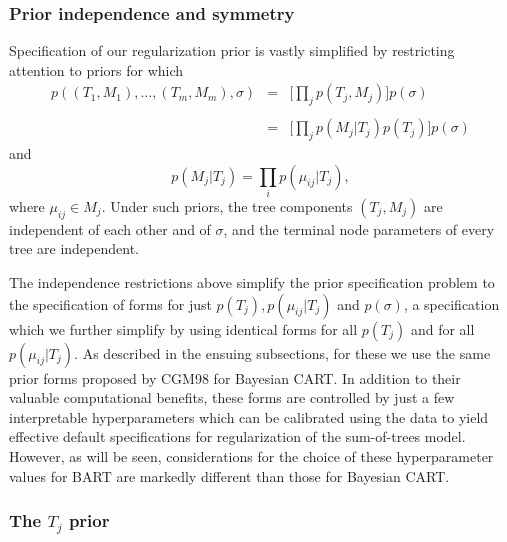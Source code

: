 \documentclass[aoas,nameyear,dvips]{arximspdf}
\begin{document}
\subsubsection{Prior independence and symmetry}\label{sec:simplification}


Specification of our regularization prior is vastly simplified by restricting attention to
priors for which
\begin{eqnarray}\label{indep1}
p((T_1,M_1),\ldots,(T_m,M_m),\sigma)
 & = &  \biggl[\prod_j p(T_j,M_j) \biggr]   p(\sigma)
 \nonumber\\[-8pt]\\[-8pt]
 & = &  \biggl[\prod_j p(M_j | T_j) p(T_j) \biggr]\nonumber
 p(\sigma)
\end{eqnarray}
and
\begin{equation}\label{indep2}
p(M_j   |   T_j) = \prod_i{p(\mu_{ij} | T_j)},
\end{equation}
where $\mu_{ij} \in M_j$.  Under such
priors, the tree components $(T_j,M_j)$ are independent of each other and of
 $\sigma$, and the terminal node parameters of every tree are
independent.


The independence restrictions above simplify the prior specification
problem to the specification of forms for just $p(T_j),
p(\mu_{ij} | T_j)$ and $p(\sigma)$, a specification which we further simplify by
using identical forms for all $p(T_j)$ and for all
$p(\mu_{ij} | T_j)$.  As described in the ensuing
subsections, for these we use the same prior forms proposed by CGM98 for
Bayesian CART.  In addition to their valuable computational
benefits, these forms are controlled by just a few interpretable
hyperparameters which can be calibrated using the data to yield
effective default specifications for regularization of the sum-of-trees model.
However, as will be seen, considerations for the choice of these hyperparameter
values for BART are markedly different than those for Bayesian CART.


\subsubsection{The $T_j$ prior}\label{sec:treeprior}
\end{document}

